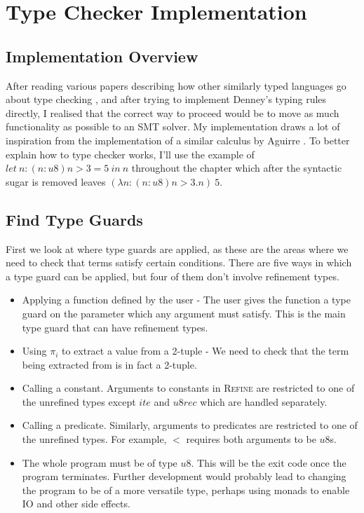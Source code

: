 \section{Type Checker Implementation}

\subsection{Implementation Overview}

After reading various papers describing how other similarly typed languages go about type checking
\cite{mengP08}\cite{blanchetteBP13}\cite{barbosaROTB19},
and after trying to implement Denney's typing rules directly, I realised that the correct way to
proceed would be to move as much functionality as possible to an SMT solver.
My implementation draws a lot of inspiration from the implementation of a similar calculus by
Aguirre \cite{aguirre16}.
To better explain how to type checker works, I'll use the example of
$let\ n: (n:u8) n > 3 = 5\ in\ n$ throughout the chapter which after the syntactic sugar is removed
leaves $(\lambda n: (n:u8) n > 3 . n)\ 5$.

\subsection{Find Type Guards}

First we look at where type guards are applied, as these are the areas where we need to check
that terms satisfy certain conditions.
There are five ways in which a type guard can be applied, but four of them don't involve refinement types.

\begin{itemize}
    \item Applying a function defined by the user -
    The user gives the function a type guard on the parameter which any argument must satisfy.
    This is the main type guard that can have refinement types.
    \item Using $\pi_i$ to extract a value from a 2-tuple -
    We need to check that the term being extracted from is in fact a 2-tuple.
    \item Calling a constant.
    Arguments to constants in \textsc{Refine} are restricted to one of the unrefined types
    except $ite$ and $u8rec$ which are handled separately.
    \item Calling a predicate.
    Similarly, arguments to predicates are restricted to one of the unrefined types.
    For example, $<$ requires both arguments to be $u8$s.
    \item The whole program must be of type $u8$.
    This will be the exit code once the program terminates.
    Further development would probably lead to changing the program to be of a more versatile type,
    perhaps using monads to enable IO and other side effects.
\end{itemize}

